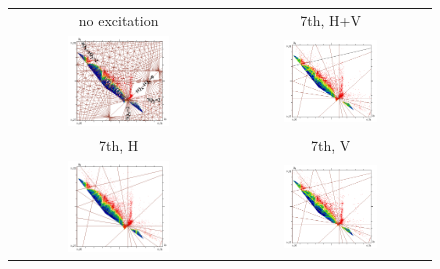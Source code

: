 \documentclass[%
 reprint,
 amsmath,amssymb,
 aps,
prstab,
longbibliography
]{revtex4-1}
\begin{document}
\begin{figure}
  \begin{tabular}{cc}
    no excitation & 7th, H+V \\
    \includegraphics[width=0.49\textwidth]{2017injnocolc15o+19_6noerru_dp0_ord14_annotate_7th.png} &
    \includegraphics[width=0.49\textwidth]{2017injnocolc15o+19_6noerrut7skhv_dp0_ord7.png} \\
    7th, H & 7th, V \\
    \includegraphics[width=0.49\textwidth]{2017injnocolc15o+19_6noerrut7skh_dp0_ord7.png} &
    \includegraphics[width=0.49\textwidth]{2017injnocolc15o+19_6noerrut7skv_dp0_ord7.png} \\

\end{tabular}
\end{figure}
\end{document}
